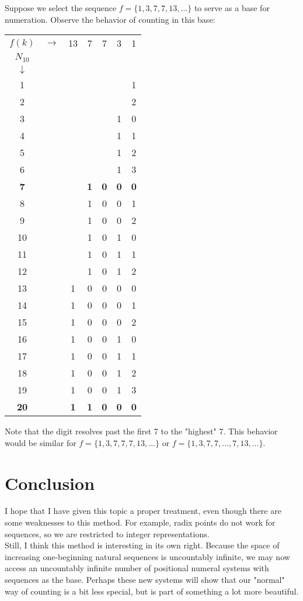 \documentclass{article}
\begin{document}
\noindent Suppose we select the sequence $f = \{1, 3, 7, 7, 13, ...\}$ to serve as a base for numeration. Observe the behavior of counting in this base:

\begin{center}
\begin{tabular} {c c c c c c c}
$f(k)$ & $\rightarrow$ & 13 & 7 & 7 & 3 & 1\\
$N_{10}$\\
$\downarrow$\\
1 & & & & & & 1\\
2 & & & & & & 2\\
3 & & & & & 1 & 0\\
4 & & & & & 1 & 1\\
5 & & & & & 1 & 2\\
6 & & & & & 1 & 3\\
\textbf{7} & & & \textbf{1} & \textbf{0} & \textbf{0} & \textbf{0}\\
8 & & & 1 & 0 & 0 & 1\\
9 & & & 1 & 0 & 0 & 2\\
10& & & 1 & 0 & 1 & 0\\
11& & & 1 & 0 & 1 & 1\\
12& & & 1 & 0 & 1 & 2\\
13& & 1 & 0 & 0 & 0 & 0\\
14& & 1 & 0 & 0 & 0 & 1\\
15& & 1 & 0 & 0 & 0 & 2\\
16& & 1 & 0 & 0 & 1 & 0\\
17& & 1 & 0 & 0 & 1 & 1\\
18& & 1 & 0 & 0 & 1 & 2\\
19& & 1 & 0 & 0 & 1 & 3\\
\textbf{20}& & \textbf{1} & \textbf{1} & \textbf{0} & \textbf{0} & \textbf{0}\\
\end{tabular}
\end{center}

\noindent Note that the digit resolves past the first 7 to the "highest" 7. This behavior would be similar for $f = \{1, 3, 7, 7, 7, 13,...\}$ or $f = \{1, 3, 7, 7, ..., 7, 13, ...\}$.

\section{Conclusion}

I hope that I have given this topic a proper treatment, even though there are some weaknesses to this method. For example, radix points do not work for sequences, so we are restricted to integer representations.\\

\noindent Still, I think this method is interesting in its own right. Because the space of increasing one-beginning natural sequences is uncountably infinite, we may now access an uncountably infinite number of positional numeral systems with sequences as the base. Perhaps these new systems will show that our "normal" way of counting is a bit less special, but is part of something a lot more beautiful.
\end{document}
